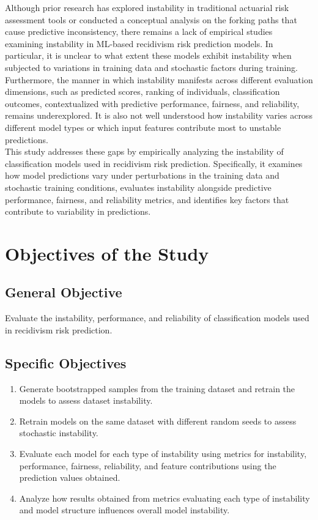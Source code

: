 \documentclass[12pt]{article}
\begin{document}
Although prior research has explored instability in traditional actuarial risk assessment tools or conducted a conceptual analysis on the forking paths that cause predictive inconsistency, there remains a lack of empirical studies examining instability in ML-based recidivism risk prediction models. In particular, it is unclear to what extent these models exhibit instability when subjected to variations in training data and stochastic factors during training. Furthermore, the manner in which instability manifests across different evaluation dimensions, such as predicted scores, ranking of individuals, classification outcomes, contextualized with predictive performance, fairness, and reliability, remains underexplored. It is also not well understood how instability varies across different model types or which input features contribute most to unstable predictions.\\

This study addresses these gaps by empirically analyzing the instability of classification models used in recidivism risk prediction. Specifically, it examines how model predictions vary under perturbations in the training data and stochastic training conditions, evaluates instability alongside predictive performance, fairness, and reliability metrics, and identifies key factors that contribute to variability in predictions.

\section{Objectives of the Study} 
\subsection{General Objective} Evaluate the instability, performance, and reliability of classification models used in recidivism risk prediction.
\subsection{Specific Objectives}
\begin{enumerate}
 \item Generate bootstrapped samples from the training dataset and retrain the models to assess dataset instability.
 \item Retrain models on the same dataset with different random seeds to assess stochastic instability.
 \item Evaluate each model for each type of instability using metrics for instability, performance, fairness, reliability, and feature contributions using the prediction values obtained. 
 \item Analyze how results obtained from metrics evaluating each type of instability and model structure influences overall model instability. 
\end{enumerate}
\end{document}

